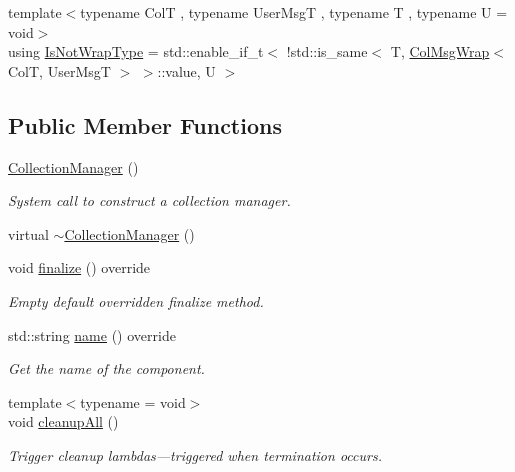 \begin{DoxyCompactItemize}
\item 
{\footnotesize template$<$typename ColT , typename User\+MsgT , typename T , typename U  = void$>$ }\\using \hyperlink{structvt_1_1vrt_1_1collection_1_1_collection_manager_a18e3a17d9eb086c6c2f499242b7faa1e}{Is\+Not\+Wrap\+Type} = std\+::enable\+\_\+if\+\_\+t$<$ !std\+::is\+\_\+same$<$ T, \hyperlink{structvt_1_1vrt_1_1collection_1_1_col_msg_wrap}{Col\+Msg\+Wrap}$<$ ColT, User\+MsgT $>$ $>$\+::value, U $>$
\end{DoxyCompactItemize}
\subsection*{Public Member Functions}
\begin{DoxyCompactItemize}
\item 
\hyperlink{structvt_1_1vrt_1_1collection_1_1_collection_manager_ad6c6c75f1f54ae5470847311256ae8c3}{Collection\+Manager} ()
\begin{DoxyCompactList}\small\item\em System call to construct a collection manager. \end{DoxyCompactList}\item 
virtual \hyperlink{structvt_1_1vrt_1_1collection_1_1_collection_manager_aea0c10371b37041bcc855eef0c767b85}{$\sim$\+Collection\+Manager} ()
\item 
void \hyperlink{structvt_1_1vrt_1_1collection_1_1_collection_manager_afafcdbf36f42835471218b654252031c}{finalize} () override
\begin{DoxyCompactList}\small\item\em Empty default overridden finalize method. \end{DoxyCompactList}\item 
std\+::string \hyperlink{structvt_1_1vrt_1_1collection_1_1_collection_manager_af7cc4c83ae2792595eee99a3206ed633}{name} () override
\begin{DoxyCompactList}\small\item\em Get the name of the component. \end{DoxyCompactList}\item 
{\footnotesize template$<$typename  = void$>$ }\\void \hyperlink{structvt_1_1vrt_1_1collection_1_1_collection_manager_a7d98e5aaa63d70cbabfbcf78a6cf503f}{cleanup\+All} ()
\begin{DoxyCompactList}\small\item\em Trigger cleanup lambdas---triggered when termination occurs. \end{DoxyCompactList}\item 

\end{DoxyCompactItemize}
